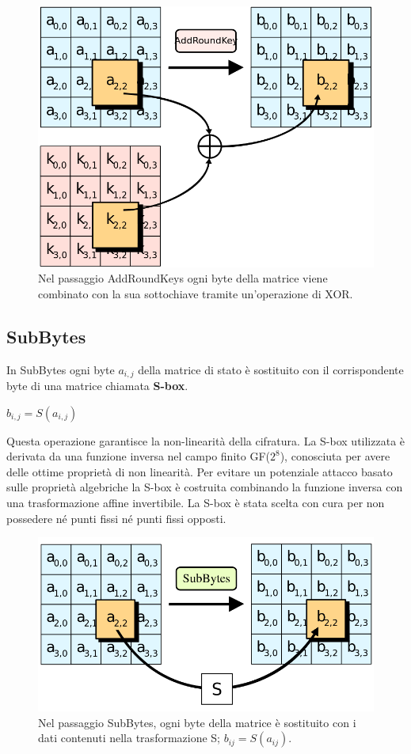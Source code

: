 \begin{figure}[H]
\centering
\includegraphics[scale=0.3]{img/addroundkey}
\caption{Nel passaggio AddRoundKeys ogni byte della matrice viene combinato con la sua sottochiave tramite un'operazione di XOR.}
\end{figure}

\subsection{SubBytes}
In SubBytes ogni byte \(a_{i,j}\) della matrice di stato è sostituito con il corrispondente byte di una matrice chiamata  \textbf{S-box}.
\begin{center}
\(b_{i,j} = S(a_{i,j})\)
\end{center}

Questa operazione garantisce la non-linearità della cifratura. 
La S-box utilizzata è derivata da una funzione inversa nel campo finito GF(\(2^8\)), conosciuta per avere delle ottime proprietà di non linearità. Per evitare un potenziale attacco basato sulle proprietà algebriche la S-box è costruita combinando la funzione inversa con una trasformazione affine invertibile. La S-box è stata scelta con cura per non possedere né punti fissi né punti fissi opposti.

\begin{figure}[H]
\centering
\includegraphics[scale=0.3]{img/subBytes}
\caption{Nel passaggio SubBytes, ogni byte della matrice è sostituito con i dati contenuti nella trasformazione S; \(b_{ij} = S(a_{ij})\).}
\end{figure}

